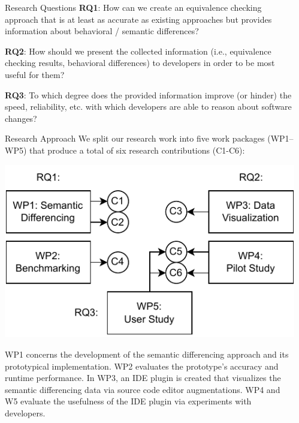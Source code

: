 \documentclass[final,hyperref={pdfpagelabels=false}]{beamer}
\begin{document}
\begin{frame}[t]
\begin{columns}[t]
\begin{column}{.45\textwidth}
    \begin{block}{Research Questions}
      \textbf{RQ1}: How can we create an equivalence checking approach that is at least as accurate as existing approaches but provides information about behavioral / semantic differences?
      \vspace{.4ex}

      \textbf{RQ2}: How should we present the collected information (i.e., equivalence checking results, behavioral differences) to developers in order to be most useful for them?
      \vspace{.4ex}

      \textbf{RQ3}: To which degree does the provided information improve (or hinder) the speed, reliability, etc. with which developers are able to reason about software changes?
    \end{block}

    \begin{block}{Research Approach}
      We split our research work into five work packages (WP1–WP5) that produce a total of six research contributions (C1-C6):

      \begin{center}
        \includegraphics[width=0.8\columnwidth]{research-approach.drawio}
      \end{center}

      WP1 concerns the development of the semantic differencing approach and its prototypical implementation. WP2 evaluates the prototype's accuracy and runtime performance. In WP3, an IDE plugin is created that visualizes the semantic differencing data via source code editor augmentations. WP4 and W5 evaluate the usefulness of the IDE plugin via experiments with developers.
    \end{block}
  \end{column} %

  \begin{column}{.02\textwidth}\end{column} %
   

\end{columns}
\end{frame}
\end{document}

